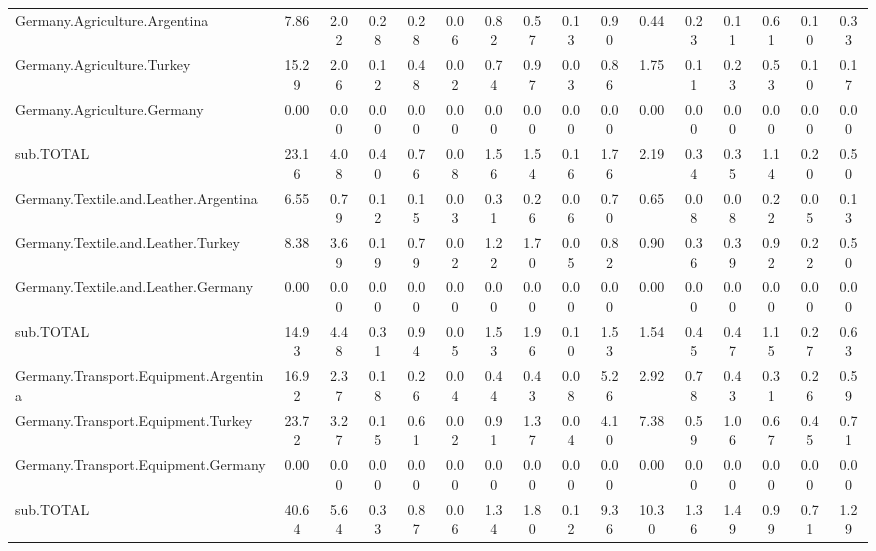 \documentclass{article}
\begin{document}
\begin{landscape}
\begin{table}[htbp]
\begin{adjustwidth}{-1.15in}{-1.15in}
\begin{tabular}{lccccccccccccccc}
    Germany.Agriculture.Argentina & 7.86  & 2.02  & 0.28  & 0.28  & 0.06  & 0.82  & 0.57  & 0.13  & 0.90  & 0.44  & 0.23  & 0.11  & 0.61  & 0.10  & 0.33 \\
    Germany.Agriculture.Turkey & 15.29 & 2.06  & 0.12  & 0.48  & 0.02  & 0.74  & 0.97  & 0.03  & 0.86  & 1.75  & 0.11  & 0.23  & 0.53  & 0.10  & 0.17 \\
    Germany.Agriculture.Germany & 0.00  & 0.00  & 0.00  & 0.00  & 0.00  & 0.00  & 0.00  & 0.00  & 0.00  & 0.00  & 0.00  & 0.00  & 0.00  & 0.00  & 0.00 \\
    sub.TOTAL & 23.16 & 4.08  & 0.40  & 0.76  & 0.08  & 1.56  & 1.54  & 0.16  & 1.76  & 2.19  & 0.34  & 0.35  & 1.14  & 0.20  & 0.50 \\
    Germany.Textile.and.Leather.Argentina & 6.55  & 0.79  & 0.12  & 0.15  & 0.03  & 0.31  & 0.26  & 0.06  & 0.70  & 0.65  & 0.08  & 0.08  & 0.22  & 0.05  & 0.13 \\
    Germany.Textile.and.Leather.Turkey & 8.38  & 3.69  & 0.19  & 0.79  & 0.02  & 1.22  & 1.70  & 0.05  & 0.82  & 0.90  & 0.36  & 0.39  & 0.92  & 0.22  & 0.50 \\
    Germany.Textile.and.Leather.Germany & 0.00  & 0.00  & 0.00  & 0.00  & 0.00  & 0.00  & 0.00  & 0.00  & 0.00  & 0.00  & 0.00  & 0.00  & 0.00  & 0.00  & 0.00 \\
    sub.TOTAL & 14.93 & 4.48  & 0.31  & 0.94  & 0.05  & 1.53  & 1.96  & 0.10  & 1.53  & 1.54  & 0.45  & 0.47  & 1.15  & 0.27  & 0.63 \\
    Germany.Transport.Equipment.Argentina & 16.92 & 2.37  & 0.18  & 0.26  & 0.04  & 0.44  & 0.43  & 0.08  & 5.26  & 2.92  & 0.78  & 0.43  & 0.31  & 0.26  & 0.59 \\
    Germany.Transport.Equipment.Turkey & 23.72 & 3.27  & 0.15  & 0.61  & 0.02  & 0.91  & 1.37  & 0.04  & 4.10  & 7.38  & 0.59  & 1.06  & 0.67  & 0.45  & 0.71 \\
    Germany.Transport.Equipment.Germany & 0.00  & 0.00  & 0.00  & 0.00  & 0.00  & 0.00  & 0.00  & 0.00  & 0.00  & 0.00  & 0.00  & 0.00  & 0.00  & 0.00  & 0.00 \\
    sub.TOTAL & 40.64 & 5.64  & 0.33  & 0.87  & 0.06  & 1.34  & 1.80  & 0.12  & 9.36  & 10.30 & 1.36  & 1.49  & 0.99  & 0.71  & 1.29 \\
    \bottomrule
    \end{tabular}
  \label{tab:wwz}
  \end{adjustwidth}
\end{table}
\end{landscape}
\end{document}
